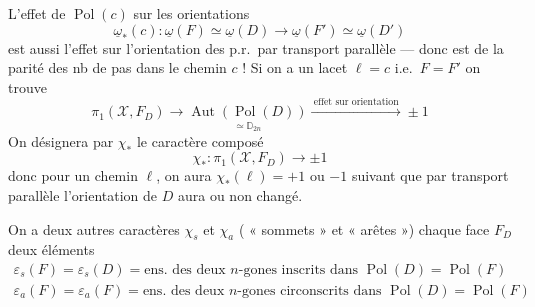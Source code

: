\documentclass[11pt,a4paper]{article}
\begin{document}
L'effet de $\operatorname{Pol}(c)$ sur les orientations
\[
\underline{\omega}_{\ast}(c) : \underline{\omega}(F) \simeq \underline{\omega}(D) \longrightarrow \underline{\omega}(F') \simeq \underline{\omega}(D')
\]
est aussi l'effet sur l'orientation des p.r.\ par transport parallèle --- donc est  de la parité des nb de pas dans le chemin $c$ ! Si on a un lacet $\ell = c$ i.e.\ $F = F'$ on trouve
\[
\pi_1(\mathcal{X}, F_D) \longrightarrow \underset{\simeq \mathbb{D}_{2n}}{\operatorname{Aut}(\operatorname{Pol}(D))} \xrightarrow{\ \text{effet sur orientation}\ } \pm 1
\]
On désignera par $\chi_{\ast}$ le caractère composé
\[
\chi_{\ast} : \pi_1(\mathcal{X}, F_D) \longrightarrow \pm 1
\]
donc pour un chemin $\ell$, on aura $\chi_{\ast}(\ell) = +1$ ou $-1$ suivant que par transport parallèle l'orientation de $D$ aura ou non changé. \struck{\ill{}}

On a deux autres caractères $\chi_s$ et $\chi_a$ (\struck{\ill{}}  « sommets » et « arêtes »)  chaque face $F_D$  deux  éléments
\[
\begin{array}{l}
\varepsilon_s(F) = \varepsilon_s(D) = \text{ens.\ des deux } n\text{-gones inscrits dans } \operatorname{Pol}(D) = \operatorname{Pol}(F) \\
\varepsilon_a(F) = \varepsilon_a(F) = \text{ens.\ des deux } n\text{-gones circonscrits dans } \operatorname{Pol}(D) = \operatorname{Pol}(F)
\end{array}
\]
\end{document}
